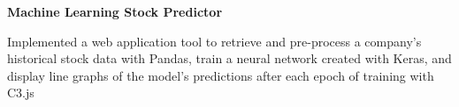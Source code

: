 \documentclass{article}
\newcommand{\project}[4]{{
\vspace*{2pt}%
\textbf{#1} #2 \hfill #3\\ #4 \vspace*{2pt}}
}
\renewcommand{\labelitemii}{
$\vcenter{\hbox{\tiny$\bullet$}}$\hspace*{-3pt}
}
\newenvironment{bullet-list-minor}{
\begin{list}{\labelitemii}{\setlength\leftmargin{15pt} 
\topsep 0pt \itemsep 1pt}}{\vspace*{4pt}\end{list}
}
\begin{document}
    \project{Machine Learning Stock Predictor}{}{}{}
    \smallskip
	\begin{bullet-list-minor}
	\item Implemented a web application tool to retrieve and pre-process a company's historical stock data with Pandas, train a neural network created with Keras, and display line graphs of the model's predictions after each epoch of training with C3.js
    \end{bullet-list-minor}
    \medskip  
\end{document}
